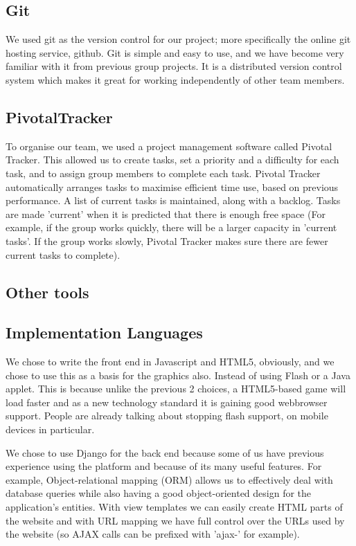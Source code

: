 \documentclass{article}
\begin{document}
\subsection{Git}
We used git as the version control for our project; more specifically the online git hosting service, github. Git is simple and easy to use, and we have become very familiar with it from previous group projects. It is a distributed version control system which makes it great for working independently of other team members.

\subsection{PivotalTracker}
To organise our team, we used a project management software called Pivotal Tracker. This allowed us to create tasks, set a priority and a difficulty for each task, and to assign group members to complete each task. Pivotal Tracker automatically arranges tasks to maximise efficient time use, based on previous performance. A list of current tasks is maintained, along with a backlog. Tasks are made 'current' when it is predicted that there is enough free space (For example, if the group works quickly, there will be a larger capacity in 'current tasks'. If the group works slowly, Pivotal Tracker makes sure there are fewer current tasks to complete).

\subsection{Other tools}

\subsection{Implementation Languages}
We chose to write the front end in Javascript and HTML5, obviously, and we chose to use this as a basis for the graphics also. Instead of using Flash or a Java applet. This is because unlike the previous 2 choices, a HTML5-based game will load faster and as a new technology standard it is gaining good webbrowser support. People are already talking about stopping flash support, on mobile devices in particular.

We chose to use Django for the back end because some of us have previous experience using the platform and because of its many useful features. For example, Object-relational mapping (ORM) allows us to effectively deal with database queries while also having a good object-oriented design for the application's entities. With view templates we can easily create HTML parts of the website and with URL mapping we have full control over the URLs used by the website (so AJAX calls can be prefixed with 'ajax-' for example).
\end{document}
